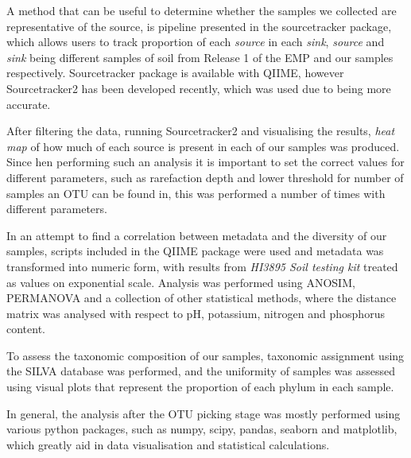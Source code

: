 \documentclass[12pt,twocolumn]{article}
\begin{document}
\par
A method that can be useful to determine whether the samples we collected are representative of the source, is pipeline presented in the sourcetracker package\cite{Knights2011}, which allows users to track proportion of each \textit{source} in each \textit{sink}, \textit{source} and \textit{sink} being different samples of soil from Release 1 of the EMP and our samples respectively. Sourcetracker package is available with QIIME, however Sourcetracker2 has been developed recently, which was used due to being more accurate. 
\par
After filtering the data, running Sourcetracker2 and visualising the results, \textit{heat map} of how much of each source is present in each of our samples was produced. Since hen performing such an analysis it is important to set the correct values for different parameters, such as rarefaction depth and lower threshold for number of samples an OTU can be found in, this was performed a number of times with different parameters.
\par
In an attempt to find a correlation between metadata and the diversity of our samples, scripts included in the QIIME package were used and metadata was transformed into numeric form, with results from \textit{HI3895 Soil testing kit} treated as values on exponential scale. Analysis was performed using ANOSIM\cite{CLARKE1993}, PERMANOVA\cite{Tang2016} and a collection of other statistical methods, where the distance matrix was analysed with respect to pH, potassium, nitrogen and phosphorus content.
\par
To assess the taxonomic composition of our samples, taxonomic assignment using the SILVA\cite{Quast2012} database was performed, and the uniformity of samples was assessed using visual plots that represent the proportion of each phylum in each sample. 
\par
In general, the analysis after the OTU picking stage was mostly performed using various python packages, such as numpy, scipy, pandas, seaborn and matplotlib, which greatly aid in data visualisation and statistical calculations.
%
%
\end{document}
